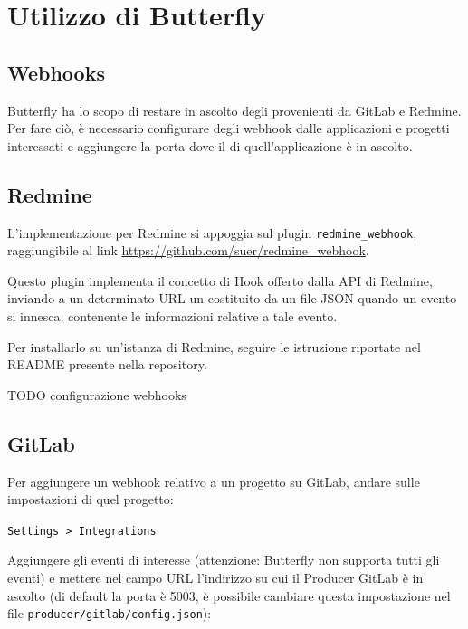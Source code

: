 \section{Utilizzo di Butterfly}\label{utilizzo}


\subsection{Webhooks} %

Butterfly ha lo scopo di restare in ascolto degli  provenienti da GitLab e Redmine.
Per fare ciò, è necessario configurare degli webhook dalle applicazioni e progetti interessati e aggiungere
la porta dove il  di quell'applicazione è in ascolto.


\subsection{Redmine}

L'implementazione per Redmine si appoggia sul plugin \texttt{redmine\_webhook}, raggiungibile al link
\url{https://github.com/suer/redmine_webhook}.

Questo plugin implementa il concetto di Hook offerto dalla API di Redmine, inviando a un determinato URL
un  costituito da un file JSON quando un evento si innesca, contenente le informazioni relative
a tale evento.

Per installarlo su un'istanza di Redmine, seguire le istruzione riportate nel README presente nella repository.

TODO configurazione webhooks


\subsection{GitLab}

Per aggiungere un webhook relativo a un progetto su GitLab, andare sulle impostazioni di quel progetto:

\begin{center}
    \texttt{Settings > Integrations}
\end{center}

Aggiungere gli eventi di interesse (attenzione: Butterfly non supporta tutti gli eventi) e mettere nel campo URL
l'indirizzo su cui il Producer GitLab è in ascolto (di default la porta è 5003, è possibile cambiare questa impostazione
nel file \texttt{producer/gitlab/config.json}): %

